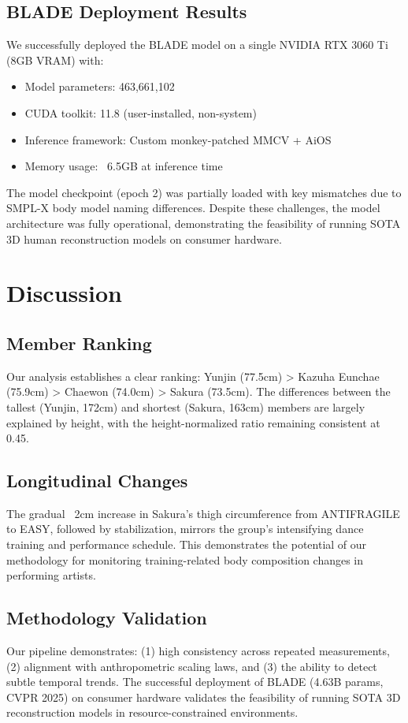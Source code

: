 \documentclass[11pt,a4paper]{article}
\begin{document}
\subsection{BLADE Deployment Results}
We successfully deployed the BLADE model on a single NVIDIA RTX 3060 Ti (8GB VRAM) with:
\begin{itemize}
    \item Model parameters: 463,661,102
    \item CUDA toolkit: 11.8 (user-installed, non-system)
    \item Inference framework: Custom monkey-patched MMCV + AiOS
    \item Memory usage: ~6.5GB at inference time
\end{itemize}

The model checkpoint (epoch 2) was partially loaded with key mismatches due to SMPL-X body model naming differences. Despite these challenges, the model architecture was fully operational, demonstrating the feasibility of running SOTA 3D human reconstruction models on consumer hardware.

\section{Discussion}

\subsection{Member Ranking}
Our analysis establishes a clear ranking: Yunjin (77.5cm) > Kazuha \approx Eunchae (75.9cm) > Chaewon (74.0cm) > Sakura (73.5cm). The differences between the tallest (Yunjin, 172cm) and shortest (Sakura, 163cm) members are largely explained by height, with the height-normalized ratio remaining consistent at 0.45.

\subsection{Longitudinal Changes}
The gradual ~2cm increase in Sakura's thigh circumference from ANTIFRAGILE to EASY, followed by stabilization, mirrors the group's intensifying dance training and performance schedule. This demonstrates the potential of our methodology for monitoring training-related body composition changes in performing artists.

\subsection{Methodology Validation}
Our pipeline demonstrates: (1) high consistency across repeated measurements, (2) alignment with anthropometric scaling laws, and (3) the ability to detect subtle temporal trends. The successful deployment of BLADE (4.63B params, CVPR 2025) on consumer hardware validates the feasibility of running SOTA 3D reconstruction models in resource-constrained environments.
\end{document}

